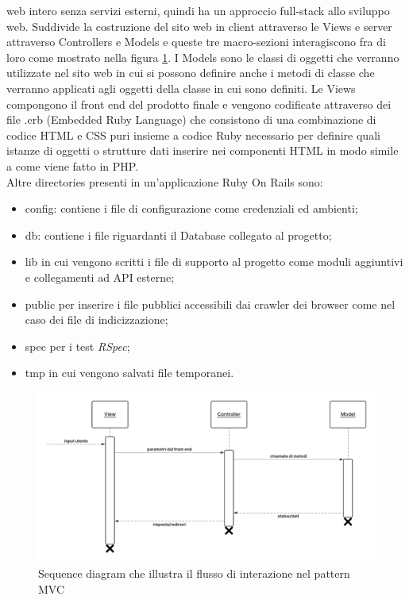 \documentclass[target=bach,aauheader=,style=]{thud}
\begin{document}
web intero senza servizi esterni, quindi ha un approccio full-stack allo sviluppo web.
Suddivide la costruzione del sito web in client attraverso le Views e server attraverso Controllers e Models e queste tre macro-sezioni interagiscono
fra di loro come mostrato nella figura \ref{fig:mvc-sequence}.
I Models sono le classi di oggetti che verranno utilizzate nel sito web in cui si possono definire anche i metodi di classe che verranno applicati agli oggetti
della classe in cui sono definiti. Le Views compongono il front end del prodotto finale e vengono codificate attraverso dei file .erb (Embedded Ruby Language)
che consistono di una combinazione di codice HTML e CSS puri insieme a codice Ruby necessario per definire quali istanze di oggetti o strutture dati inserire
nei componenti HTML in modo simile a come viene fatto in PHP.\\
Altre directories presenti in un'applicazione Ruby On Rails sono:
\begin{itemize}
    \item config: contiene i file di configurazione come credenziali ed ambienti;
    \item db: contiene i file riguardanti il Database collegato al progetto;
    \item lib in cui vengono scritti i file di supporto al progetto come moduli aggiuntivi e collegamenti ad API esterne;
    \item public per inserire i file pubblici accessibili dai crawler dei browser come nel caso dei file di indicizzazione;
    \item spec per i test \textit{RSpec};
    \item tmp in cui vengono salvati file temporanei.
\end{itemize}
\begin{figure}[h]
\centering
\includegraphics[width=0.8\linewidth]{Sequence Diagram pattern MVC.png}
\caption{Sequence diagram che illustra il flusso di interazione nel pattern MVC}
\label{fig:mvc-sequence}
\end{figure}
\end{document}
